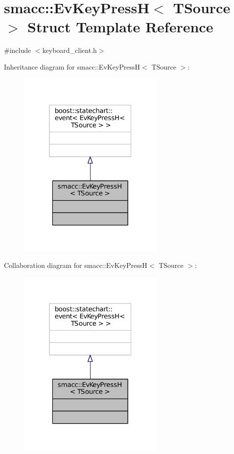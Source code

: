 \hypertarget{structsmacc_1_1EvKeyPressH}{}\section{smacc\+:\+:Ev\+Key\+PressH$<$ T\+Source $>$ Struct Template Reference}
\label{structsmacc_1_1EvKeyPressH}


{\ttfamily \#include $<$keyboard\+\_\+client.\+h$>$}



Inheritance diagram for smacc\+:\+:Ev\+Key\+PressH$<$ T\+Source $>$\+:
\nopagebreak
\begin{figure}[H]
\begin{center}
\leavevmode
\includegraphics[width=205pt]{structsmacc_1_1EvKeyPressH__inherit__graph}
\end{center}
\end{figure}


Collaboration diagram for smacc\+:\+:Ev\+Key\+PressH$<$ T\+Source $>$\+:
\nopagebreak
\begin{figure}[H]
\begin{center}
\leavevmode
\includegraphics[width=205pt]{structsmacc_1_1EvKeyPressH__coll__graph}
\end{center}
\end{figure}


